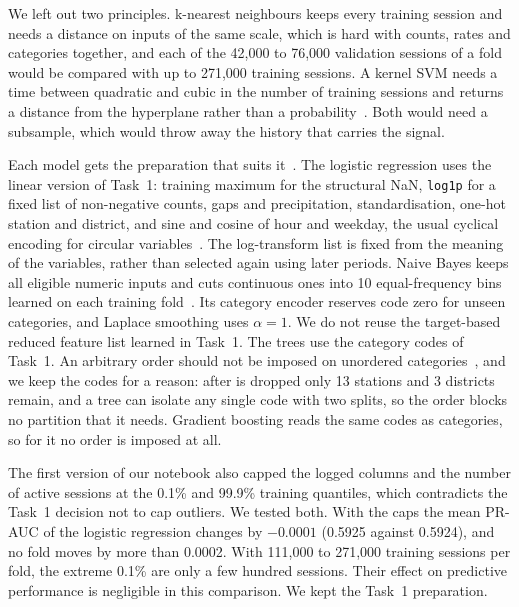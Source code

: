 \documentclass[12pt,a4paper,openany]{report}
\begin{document}
We left out two principles. k-nearest neighbours keeps every training session and needs a distance on inputs of
the same scale, which is hard with counts, rates and categories together, and each of the 42,000 to 76,000
validation sessions of a fold would be compared with up to 271,000 training sessions. A kernel \acs{SVM} needs a
time between quadratic and cubic in the number of training sessions and returns a distance from the hyperplane
rather than a probability~\cite{mindd04,mindd05}. Both would need a subsample, which would throw away the history that carries the signal.

Each model gets the preparation that suits it~\cite{mindd05}. The logistic regression uses the linear version
of Task~1: training maximum for the structural \acs{NaN}, \texttt{log1p} for a fixed list of non-negative
counts, gaps and precipitation, standardisation,
one-hot station and district, and sine and cosine of hour and weekday, the usual cyclical encoding
for circular variables~\cite{mindd03}. The log-transform list is fixed from the meaning of the variables, rather
than selected again using later periods. Naive Bayes keeps all eligible numeric inputs and cuts continuous ones into
10 equal-frequency bins learned on each training fold~\cite{mindd03,sklearn}. Its category encoder reserves code
zero for unseen categories, and Laplace smoothing uses $\alpha=1$. We do not reuse the target-based reduced
feature list learned in Task~1. The trees use the category codes of Task~1. An arbitrary
order should not be imposed on unordered categories~\cite{mindd05}, and we keep the codes for a reason: after
 is dropped only 13 stations and 3 districts remain, and a tree can isolate any single code with two
splits, so the order blocks no partition that it needs. Gradient boosting reads the same codes as categories, so for
it no order is imposed at all.

The first version of our notebook also capped the logged columns and the number of active sessions at the 0.1\%
and 99.9\% training quantiles, which contradicts the Task~1 decision not to cap outliers. We tested both. With the
caps the mean \acs{PR-AUC} of the logistic regression changes by $-0.0001$ (0.5925 against 0.5924), and no fold moves
by more than 0.0002. With 111,000 to 271,000 training sessions per fold, the extreme 0.1\% are only a few hundred
sessions. Their effect on predictive performance is negligible in this comparison. We kept the Task~1 preparation.
\end{document}

